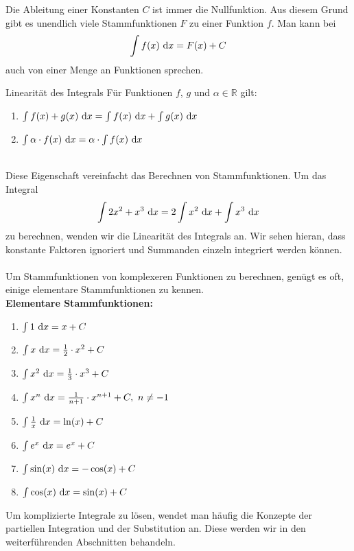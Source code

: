 Die Ableitung einer Konstanten $C$ ist immer die Nullfunktion.
Aus diesem Grund gibt es unendlich viele Stammfunktionen $F$ zu einer Funktion $f$.
Man kann bei
\begin{align*}
\int f(x) \ \text{\rmfamily d} x = F(x) + C
\end{align*}
auch von einer Menge an Funktionen sprechen.
\\
\begin{mybox}{Linearität des Integrals}
Für Funktionen $f$, $g$ und $\alpha \in \mathbb{R}$
gilt:
\begin{enumerate}
\item 
$\int f(x) + g(x) \ \text{\rmfamily d} x = \int f(x)  \ \text{\rmfamily d} x + \int  g(x) \ \text{\rmfamily d} x$
\item 
$\int \alpha \cdot f(x) \ \text{\rmfamily d} x = \alpha \cdot\int  f(x) \ \text{\rmfamily d} x$
\end{enumerate}
\end{mybox}
\ \\
Diese Eigenschaft vereinfacht das Berechnen von Stammfunktionen.
Um das Integral 
\begin{align*}
\int 2x^2 + x^3 \ \text{\rmfamily d} x  = 2 \int x^2  \ \text{\rmfamily d} x  + \int x^3 \ \text{\rmfamily d} x 
\end{align*}
zu berechnen, wenden wir die Linearität des Integrals an. Wir sehen hieran, dass konstante Faktoren ignoriert und Summanden einzeln integriert werden können.\\
\\
Um Stammfunktionen von komplexeren Funktionen zu berechnen, genügt es oft, einige elementare Stammfunktionen zu kennen.\\
\newpage
\textbf{Elementare Stammfunktionen:}
\begin{enumerate}
\item 
$\int 1 \ \text{\rmfamily d} x = x + C$
\item
$\int x \ \text{\rmfamily d} x = \frac{1}{2} \cdot x^2 +C$
\item
$\int x^2 \ \text{\rmfamily d} x = \frac{1}{3} \cdot x^3 + C$ 
\item
$\int x^n \ \text{\rmfamily d} x = 
\frac{1}{n+1} \cdot x^{n+1}+ C , \ n \neq -1
$
\item
$\int \frac{1}{x} \ \text{\rmfamily d} x = \ln(x) + C$
\item $\int e^x \ \text{\rmfamily d} x = e^x + C$
\item $\int \sin(x) \ \text{\rmfamily d} x = - \cos(x) + C$
\item $\int \cos(x) \ \text{\rmfamily d} x = \sin(x) +C$
\end{enumerate}
Um komplizierte Integrale zu lösen, wendet man häufig die Konzepte der partiellen Integration und der Substitution an.
Diese werden wir in den weiterführenden Abschnitten behandeln.

